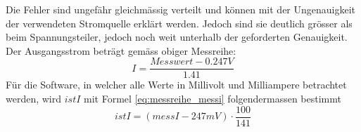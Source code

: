Die Fehler sind ungefähr gleichmässig verteilt und können mit der Ungenauigkeit der verwendeten Stromquelle erklärt werden. Jedoch sind sie deutlich grösser als beim Spannungsteiler, jedoch noch weit unterhalb der geforderten Genauigkeit. Der Ausgangsstrom beträgt gemäss obiger Messreihe:
\begin{equation}
	I=\frac{Messwert-0.247V}{1.41}
\label{eq:messreihe_messi}
\end{equation}
Für die Software, in welcher alle Werte in Millivolt und Milliampere betrachtet werden, wird $istI$ mit Formel \ref{eq:messreihe_messi} folgendermassen bestimmt
\begin{equation}
	istI=\left(messI-247mV\right)\cdot\frac{100}{141}
\label{eq:messreihe_messi_sw}
\end{equation}